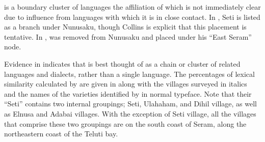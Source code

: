 \largerpage
{}
 is a boundary cluster of languages the affiliation
of which is not immediately clear due to influence from  languages with which it is in close contact.
In \citet[20, 37]{Collins1983},
Seti is listed as a branch under Nunusaku,
though Collins is explicit that this placement is tentative.
In \citet{Collins1986},  was removed from Nunusaku
and placed under his “East Seram” node.

Evidence in \citet[117--121]{LoskiLoski1989} indicates that
 is best thought of as a chain or cluster of
related languages and dialects, rather than a single language.
The percentages of lexical similarity calculated by \citet[119]{LoskiLoski1989}
are given in  along with the villages surveyed in
italics and the names of the varieties identified by \citet{LoskiLoski1989} in normal typeface.
Note that their “Seti” contains two internal groupings; Seti,
Ulahaham, and Dihil village, as well as Elnusa and Adabai villages.
With the exception of Seti village,
all the villages that comprise these two groupings are on the
south coast of Seram,
along the northeastern coast of the Teluti bay.


